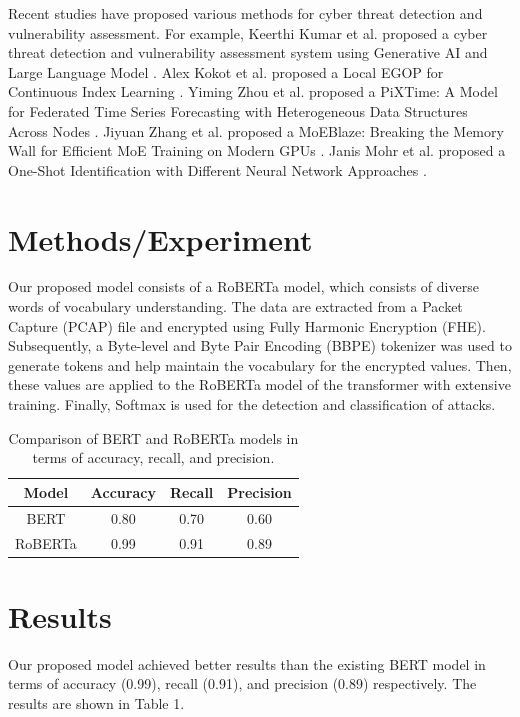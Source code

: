 \documentclass{article}
\begin{document}
Recent studies have proposed various methods for cyber threat detection and vulnerability assessment. For example, Keerthi Kumar et al. proposed a cyber threat detection and vulnerability assessment system using Generative AI and Large Language Model \cite{m2026cyberthreatdetectionvulnerability}. Alex Kokot et al. proposed a Local EGOP for Continuous Index Learning \cite{kokot2026localegopcontinuousindex}. Yiming Zhou et al. proposed a PiXTime: A Model for Federated Time Series Forecasting with Heterogeneous Data Structures Across Nodes \cite{zhou2026pixtimemodelfederatedtime}. Jiyuan Zhang et al. proposed a MoEBlaze: Breaking the Memory Wall for Efficient MoE Training on Modern GPUs \cite{zhang2026moeblazebreakingmemorywall}. Janis Mohr et al. proposed a One-Shot Identification with Different Neural Network Approaches \cite{mohr2026oneshotidentificationdifferentneural}.

\section{Methods/Experiment}

Our proposed model consists of a RoBERTa model, which consists of diverse words of vocabulary understanding. The data are extracted from a Packet Capture (PCAP) file and encrypted using Fully Harmonic Encryption (FHE). Subsequently, a Byte-level and Byte Pair Encoding (BBPE) tokenizer was used to generate tokens and help maintain the vocabulary for the encrypted values. Then, these values are applied to the RoBERTa model of the transformer with extensive training. Finally, Softmax is used for the detection and classification of attacks.

\begin{table}[h]
\centering
\begin{tabular}{|c|c|c|c|}
\hline
Model & Accuracy & Recall & Precision \\
\hline
BERT & 0.80 & 0.70 & 0.60 \\
\hline
RoBERTa & 0.99 & 0.91 & 0.89 \\
\hline
\end{tabular}
\caption{Comparison of BERT and RoBERTa models in terms of accuracy, recall, and precision.}
\end{table}

\section{Results}

Our proposed model achieved better results than the existing BERT model in terms of accuracy (0.99), recall (0.91), and precision (0.89) respectively. The results are shown in Table 1.
\end{document}
